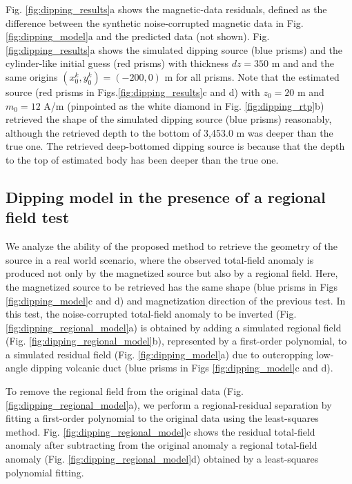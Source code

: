 Fig. \ref{fig:dipping_results}a shows the magnetic-data residuals, defined as the difference
between the synthetic noise-corrupted magnetic data in Fig. \ref{fig:dipping_model}a 
and the predicted data (not shown).
Fig. \ref{fig:dipping_results}a shows the simulated dipping source (blue prisms) and 
the cylinder-like initial guess (red prisms) with  thickness $ dz = 350 $ m and 
and the same origins $(x^k_0, y^k_0) = (-200, 0) $ m for all prisms.
Note that the estimated source (red prisms in Figs.\ref{fig:dipping_results}c and d)
with $z_0 = 20$ m and $m_0 = 12$ A/m 
(pinpointed as the white diamond in Fig. \ref{fig:dipping_rtp}b)
retrieved the shape of the  simulated dipping source (blue prisms) reasonably, although
the retrieved depth to the bottom of 3,453.0 m was deeper than the true one.
The retrieved deep-bottomed dipping source is because that the depth to the top 
of estimated body has been deeper than the true one.


\subsection{Dipping model in the presence of a regional field test}

We analyze the ability of the proposed method to retrieve the geometry of the source
in a real world scenario, where the observed total-field anomaly is produced not only by 
the magnetized source but also by  a regional field. 
Here, the magnetized source to be retrieved has the same shape (blue prisms in Figs \ref{fig:dipping_model}c and d) and magnetization direction of the previous test. 
In this test, the noise-corrupted total-field anomaly to be inverted 
(Fig. \ref{fig:dipping_regional_model}a) is obtained by adding 
a  simulated regional field (Fig. \ref{fig:dipping_regional_model}b), 
represented by a first-order polynomial, 
to  a simulated residual field (Fig. \ref{fig:dipping_model}a) due to outcropping low-angle dipping volcanic duct (blue prisms in Figs \ref{fig:dipping_model}c and d). 

To remove the regional field from the original data (Fig. \ref{fig:dipping_regional_model}a),
we perform a regional-residual separation by fitting a first-order polynomial 
to the original data using the least-squares method.
Fig. \ref{fig:dipping_regional_model}c shows the residual total-field anomaly after subtracting from the original anomaly a regional total-field anomaly 
(Fig. \ref{fig:dipping_regional_model}d) obtained by a least-squares polynomial fitting. 

